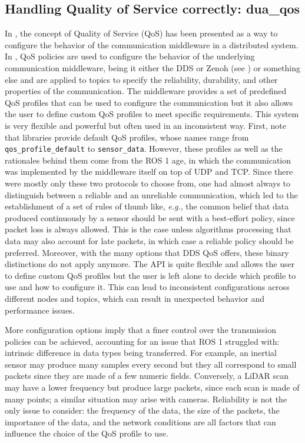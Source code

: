 \subsection{Handling Quality of Service correctly: dua\_qos}
\label{sec:dua_qos}
In , the concept of Quality of Service (QoS) has been presented as a way to configure the behavior of the communication middleware in a distributed system. In \ROS, QoS policies are used to configure the behavior of the underlying communication middleware, being it either the DDS or Zenoh (see ) or something else and are applied to topics to specify the reliability, durability, and other properties of the communication. The \ROS middleware provides a set of predefined QoS profiles that can be used to configure the communication but it also allows the user to define custom QoS profiles to meet specific requirements. This system is very flexible and powerful but often used in an inconsistent way. First, note that \ROS libraries provide default QoS profiles, whose names range from \texttt{qos\_profile\_default} to \texttt{sensor\_data}. However, these profiles as well as the rationales behind them come from the ROS 1 age, in which the communication was implemented by the middleware itself on top of UDP and TCP. Since there were mostly only these two protocols to choose from, one had almost always to distinguish between a reliable and an unreliable communication, which led to the establishment of a set of rules of thumb like, \emph{e.g.}, the common belief that data produced continuously by a sensor should be sent with a best-effort policy, since packet loss is always allowed. This is the case unless algorithms processing that data may also account for late packets, in which case a reliable policy should be preferred. Moreover, with the many options that DDS QoS offers, these binary distinctions do not apply anymore. The \ROS API is quite flexible and allows the user to define custom QoS profiles but the user is left alone to decide which profile to use and how to configure it. This can lead to inconsistent configurations across different nodes and topics, which can result in unexpected behavior and performance issues.

More configuration options imply that a finer control over the transmission policies can be achieved, accounting for an issue that ROS 1 struggled with: intrinsic difference in data types being transferred. For example, an inertial sensor may produce many samples every second but they all correspond to small packets since they are made of a few numeric fields. Conversely, a LiDAR scan may have a lower frequency but produce large packets, since each scan is made of many points; a similar situation may arise with cameras. Reliability is not the only issue to consider: the frequency of the data, the size of the packets, the importance of the data, and the network conditions are all factors that can influence the choice of the QoS profile to use.

